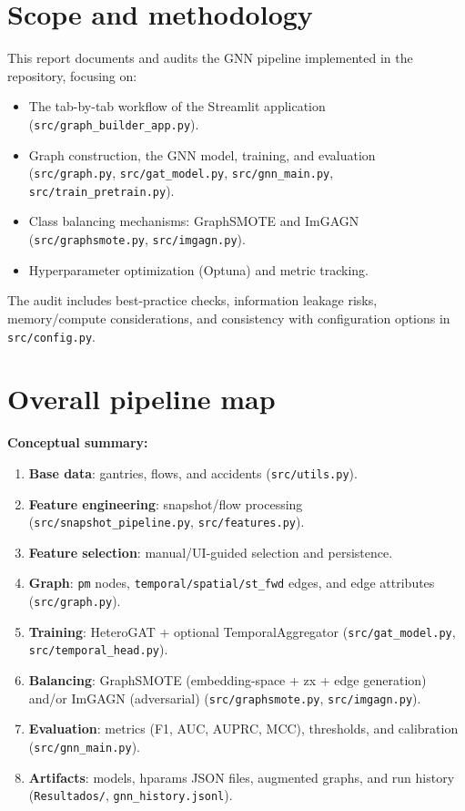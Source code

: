 \section{Scope and methodology}
This report documents and audits the GNN pipeline implemented in the repository, focusing on:
\begin{itemize}[leftmargin=*]
  \item The tab-by-tab workflow of the Streamlit application (\texttt{src/graph\_builder\_app.py}).
  \item Graph construction, the GNN model, training, and evaluation (\texttt{src/graph.py}, \texttt{src/gat\_model.py}, \texttt{src/gnn\_main.py}, \texttt{src/train\_pretrain.py}).
  \item Class balancing mechanisms: GraphSMOTE and ImGAGN (\texttt{src/graphsmote.py}, \texttt{src/imgagn.py}).
  \item Hyperparameter optimization (Optuna) and metric tracking.
\end{itemize}
The audit includes best-practice checks, information leakage risks, memory/compute considerations, and consistency with configuration options in \texttt{src/config.py}.

\section{Overall pipeline map}
\textbf{Conceptual summary:}
\begin{enumerate}[leftmargin=*]
  \item \textbf{Base data}: gantries, flows, and accidents (\texttt{src/utils.py}).
  \item \textbf{Feature engineering}: snapshot/flow processing (\texttt{src/snapshot\_pipeline.py}, \texttt{src/features.py}).
  \item \textbf{Feature selection}: manual/UI-guided selection and persistence.
  \item \textbf{Graph}: \texttt{pm} nodes, \texttt{temporal/spatial/st\_fwd} edges, and edge attributes (\texttt{src/graph.py}).
  \item \textbf{Training}: HeteroGAT + optional TemporalAggregator (\texttt{src/gat\_model.py}, \texttt{src/temporal\_head.py}).
  \item \textbf{Balancing}: GraphSMOTE (embedding-space + z\textrm{\textrightarrow}x + edge generation) and/or ImGAGN (adversarial) (\texttt{src/graphsmote.py}, \texttt{src/imgagn.py}).
  \item \textbf{Evaluation}: metrics (F1, AUC, AUPRC, MCC), thresholds, and calibration (\texttt{src/gnn\_main.py}).
  \item \textbf{Artifacts}: models, hparams JSON files, augmented graphs, and run history (\texttt{Resultados/}, \texttt{gnn\_history.jsonl}).
\end{enumerate}

